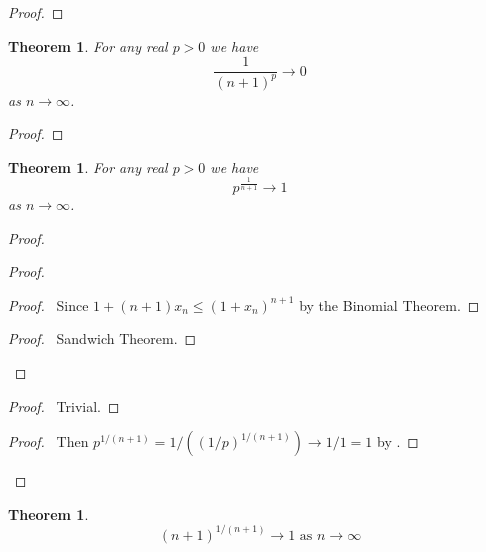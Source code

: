 \documentclass{book}
\let\qed\relax
\newtheorem{thm}[prop]{Theorem}
\theoremstyle{definition}
\begin{document}
\begin{proof}
\pf
{}
\qed
\end{proof}

\begin{thm}
\label{thm:n_to_the_p_tends_to_zero}
For any real $p > 0$ we have
\[ \frac{1}{(n+1)^p} \rightarrow 0 \]
as $n \rightarrow \infty$.
\end{thm}

\begin{proof}
\pf
{}
\qed
\end{proof}

\begin{thm}
For any real $p > 0$ we have
\[ p^{\frac{1}{n+1}} \rightarrow 1 \]
as $n \rightarrow \infty$.
\end{thm}

\begin{proof}
\pf
{}
\begin{proof}
	\begin{proof}
		\pf\ Since $1 + (n+1)x_n \leq (1 + x_n)^{n+1}$ by the Binomial Theorem.
	\end{proof}
	\begin{proof}
		\pf\ Sandwich Theorem.
	\end{proof}
\end{proof}
\begin{proof}
	\pf\ Trivial.
\end{proof}
\begin{proof}
	\pf\ Then $p^{1/(n+1)} = 1/((1/p)^{1/(n+1)}) \rightarrow 1/1 = 1$ by .
\end{proof}
\qed
\end{proof}

\begin{thm}
\[ (n+1)^{1/(n+1)} \rightarrow 1 \text{ as } n \rightarrow \infty \]
\end{thm}
\end{document}
